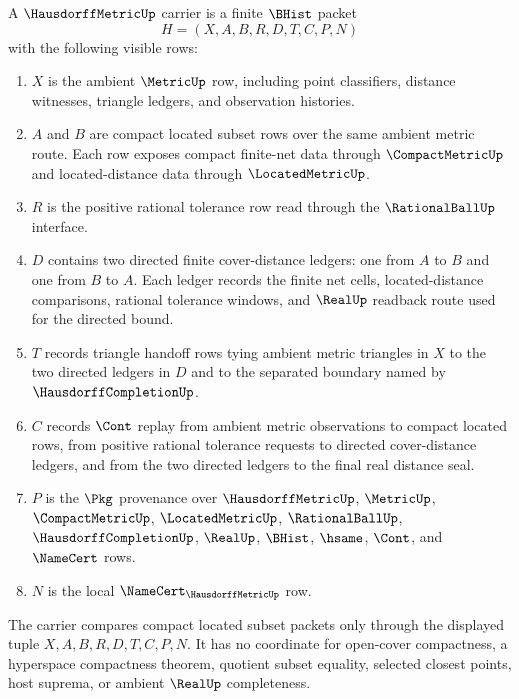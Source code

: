 \begin{definition}
\label{def:hausdorff-metric-carrier}
A $\HausdorffMetricUp$ carrier is a finite $\BHist$ packet
$$
H=(X,A,B,R,D,T,C,P,N)
$$
with the following visible rows:
\begin{enumerate}
\item $X$ is the ambient $\MetricUp$ row, including point classifiers, distance witnesses, triangle ledgers, and observation histories.
\item $A$ and $B$ are compact located subset rows over the same ambient metric route. Each row exposes compact finite-net data through $\CompactMetricUp$ and located-distance data through $\LocatedMetricUp$.
\item $R$ is the positive rational tolerance row read through the $\RationalBallUp$ interface.
\item $D$ contains two directed finite cover-distance ledgers: one from $A$ to $B$ and one from $B$ to $A$. Each ledger records the finite net cells, located-distance comparisons, rational tolerance windows, and $\RealUp$ readback route used for the directed bound.
\item $T$ records triangle handoff rows tying ambient metric triangles in $X$ to the two directed ledgers in $D$ and to the separated boundary named by $\HausdorffCompletionUp$.
\item $C$ records $\Cont$ replay from ambient metric observations to compact located rows, from positive rational tolerance requests to directed cover-distance ledgers, and from the two directed ledgers to the final real distance seal.
\item $P$ is the $\Pkg$ provenance over $\HausdorffMetricUp$, $\MetricUp$, $\CompactMetricUp$, $\LocatedMetricUp$, $\RationalBallUp$, $\HausdorffCompletionUp$, $\RealUp$, $\BHist$, $\hsame$, $\Cont$, and $\NameCert$ rows.
\item $N$ is the local $\NameCert_{\HausdorffMetricUp}$ row.
\end{enumerate}
The carrier compares compact located subset packets only through the displayed tuple $X,A,B,R,D,T,C,P,N$. It has no coordinate for open-cover compactness, a hyperspace compactness theorem, quotient subset equality, selected closest points, host suprema, or ambient $\RealUp$ completeness.
\end{definition}

